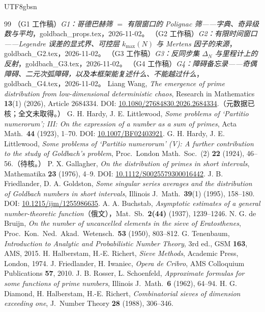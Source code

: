 \documentclass[11pt,a4paper]{article}
\theoremstyle{plain}
\theoremstyle{definition}
\begin{document}
\begin{CJK}{UTF8}{gbsn}
\begin{thebibliography}{99}
 （G1 工作稿）\emph{G1：哥德巴赫筛 $=$ 有限窗口的 Polignac 筛——字典、奇异级数与平均}，goldbach\_props.tex，2026-11-02。
 （G2 工作稿）\emph{G2：有限时间窗口——Legendre 误差的显式界、可控层 $k_{\max}(N)$ 与 Mertens 因子的来源}，goldbach\_G2.tex，2026-11-02。
 （G3 工作稿）\emph{G3：反同步集 $\Delta_N$ 与里程计上的反射}，goldbach\_G3.tex，2026-11-02。
 （G4 工作稿）\emph{G4：障碍备忘录——奇偶障碍、二元次弧障碍，以及本框架能复述什么、不能越过什么}，goldbach\_G4.tex，2026-11-02。
 Liang Wang, \emph{The emergence of prime distribution from low-dimensional deterministic chaos},
Research in Mathematics \textbf{13}(1) (2026), Article 2684334. DOI: \url{10.1080/27684830.2026.2684334}.（元数据已核；全文未取得。）
 G. H. Hardy, J. E. Littlewood, \emph{Some problems of `Partitio numerorum'; III: On the expression of a number as a sum of primes},
Acta Math.\ \textbf{44} (1923), 1--70. DOI: \url{10.1007/BF02403921}.
 G. H. Hardy, J. E. Littlewood, \emph{Some problems of `Partitio numerorum' (V): A further contribution to the study of Goldbach's problem},
Proc.\ London Math.\ Soc.\ (2) \textbf{22} (1924), 46--56.（待核。）
 P. X. Gallagher, \emph{On the distribution of primes in short intervals}, Mathematika \textbf{23} (1976), 4--9. DOI: \url{10.1112/S0025579300016442}.
 J. B. Friedlander, D. A. Goldston, \emph{Some singular series averages and the distribution of Goldbach numbers in short intervals},
Illinois J.\ Math.\ \textbf{39}(1) (1995), 158--180. DOI: \url{10.1215/ijm/1255986635}.
 A. A. Buchstab, \emph{Asymptotic estimates of a general number-theoretic function}（俄文），Mat.\ Sb.\ \textbf{2(44)} (1937), 1239--1246.
 N. G. de Bruijn, \emph{On the number of uncancelled elements in the sieve of Eratosthenes}, Proc.\ Kon.\ Ned.\ Akad.\ Wetensch.\ \textbf{53} (1950), 803--812.
 G. Tenenbaum, \emph{Introduction to Analytic and Probabilistic Number Theory}, 3rd ed., GSM \textbf{163}, AMS, 2015.
 H. Halberstam, H.-E. Richert, \emph{Sieve Methods}, Academic Press, London, 1974.
 J. Friedlander, H. Iwaniec, \emph{Opera de Cribro}, AMS Colloquium Publications \textbf{57}, 2010.
 J. B. Rosser, L. Schoenfeld, \emph{Approximate formulas for some functions of prime numbers}, Illinois J.\ Math.\ \textbf{6} (1962), 64--94.
 H. G. Diamond, H. Halberstam, H.-E. Richert, \emph{Combinatorial sieves of dimension exceeding one}, J.\ Number Theory \textbf{28} (1988), 306--346.

\end{thebibliography}
\end{CJK}
\end{document}
